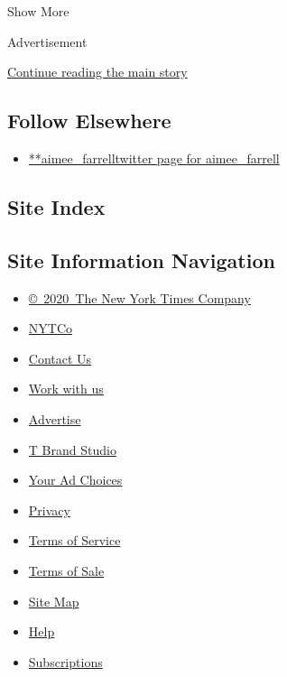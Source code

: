 Show More

Advertisement

\protect\hyperlink{after-mid2}{Continue reading the main story}

\hypertarget{follow-elsewhere}{%
\subsection{Follow Elsewhere}\label{follow-elsewhere}}

\begin{itemize}
\tightlist
\item
  \href{https://twitter.com/aimee_farrell}{**aimee\_farrelltwitter page
  for aimee\_farrell}
\end{itemize}

\hypertarget{site-index}{%
\subsection{Site Index}\label{site-index}}

\hypertarget{site-information-navigation}{%
\subsection{Site Information
Navigation}\label{site-information-navigation}}

\begin{itemize}
\tightlist
\item
  \href{https://help.nytimes3xbfgragh.onion/hc/en-us/articles/115014792127-Copyright-notice}{©~2020~The
  New York Times Company}
\end{itemize}

\begin{itemize}
\tightlist
\item
  \href{https://www.nytco.com/}{NYTCo}
\item
  \href{https://help.nytimes3xbfgragh.onion/hc/en-us/articles/115015385887-Contact-Us}{Contact
  Us}
\item
  \href{https://www.nytco.com/careers/}{Work with us}
\item
  \href{https://nytmediakit.com/}{Advertise}
\item
  \href{http://www.tbrandstudio.com/}{T Brand Studio}
\item
  \href{https://www.nytimes3xbfgragh.onion/privacy/cookie-policy\#how-do-i-manage-trackers}{Your
  Ad Choices}
\item
  \href{https://www.nytimes3xbfgragh.onion/privacy}{Privacy}
\item
  \href{https://help.nytimes3xbfgragh.onion/hc/en-us/articles/115014893428-Terms-of-service}{Terms
  of Service}
\item
  \href{https://help.nytimes3xbfgragh.onion/hc/en-us/articles/115014893968-Terms-of-sale}{Terms
  of Sale}
\item
  \href{https://spiderbites.nytimes3xbfgragh.onion}{Site Map}
\item
  \href{https://help.nytimes3xbfgragh.onion/hc/en-us}{Help}
\item
  \href{https://www.nytimes3xbfgragh.onion/subscription?campaignId=37WXW}{Subscriptions}
\end{itemize}
